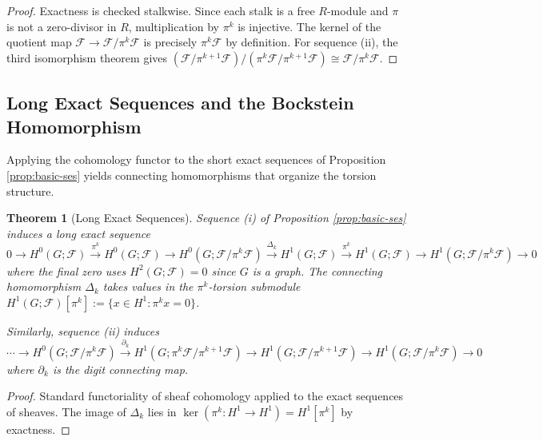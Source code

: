 \documentclass[11pt]{amsart}
\theoremstyle{plain}
\newtheorem{theorem}{Theorem}[section]
\theoremstyle{definition}
\newcommand{\Ring}{R}                          %
\newcommand{\unif}{\pi}                        %
\newcommand{\sheaf}[1]{\mathcal{#1}}                  %
\newcommand{\Conn}[1]{\Delta_{#1}}   %
\newcommand{\Digit}[1]{\partial_{#1}}%
\begin{document}
\begin{proof}
Exactness is checked stalkwise. Since each stalk is a free $\Ring$-module and 
$\unif$ is not a zero-divisor in $\Ring$, multiplication by $\unif^k$ is injective. 
The kernel of the quotient map $\sheaf{F} \to \sheaf{F}/\unif^k\sheaf{F}$ is 
precisely $\unif^k\sheaf{F}$ by definition. For sequence (ii), the third isomorphism 
theorem gives $(\sheaf{F}/\unif^{k+1}\sheaf{F})/(\unif^k\sheaf{F}/\unif^{k+1}\sheaf{F}) 
\cong \sheaf{F}/\unif^k\sheaf{F}$.
\end{proof}

\subsection{Long Exact Sequences and the Bockstein Homomorphism}
\label{ssec:bockstein}

Applying the cohomology functor to the short exact sequences of Proposition 
\ref{prop:basic-ses} yields connecting homomorphisms that organize the torsion 
structure.

\begin{theorem}[Long Exact Sequences]
\label{thm:les}
{\cite{Rotman2009,McCleary2000}}
Sequence (i) of Proposition \ref{prop:basic-ses} induces a long exact sequence
\[
0 \to H^0(G; \sheaf{F}) \xrightarrow{\unif^k} H^0(G; \sheaf{F}) \to 
H^0(G; \sheaf{F}/\unif^k\sheaf{F}) \xrightarrow{\Conn{k}} H^1(G; \sheaf{F}) 
\xrightarrow{\unif^k} H^1(G; \sheaf{F}) \to H^1(G; \sheaf{F}/\unif^k\sheaf{F}) \to 0
\]
where the final zero uses $H^2(G; \sheaf{F}) = 0$ since $G$ is a graph. The 
\emph{connecting homomorphism} $\Conn{k}$ takes values in the $\unif^k$-torsion 
submodule $H^1(G; \sheaf{F})[\unif^k] := \{x \in H^1 : \unif^k x = 0\}$.

Similarly, sequence (ii) induces
\[
\cdots \to H^0(G; \sheaf{F}/\unif^k\sheaf{F}) \xrightarrow{\Digit{k}} 
H^1(G; \unif^k\sheaf{F}/\unif^{k+1}\sheaf{F}) \to 
H^1(G; \sheaf{F}/\unif^{k+1}\sheaf{F}) \to H^1(G; \sheaf{F}/\unif^k\sheaf{F}) \to 0
\]
where $\Digit{k}$ is the \emph{digit connecting map}.
\end{theorem}

\begin{proof}
Standard functoriality of sheaf cohomology applied to the exact sequences of sheaves. 
The image of $\Conn{k}$ lies in $\ker(\unif^k: H^1 \to H^1) = H^1[\unif^k]$ by 
exactness.
\end{proof}
\end{document}
